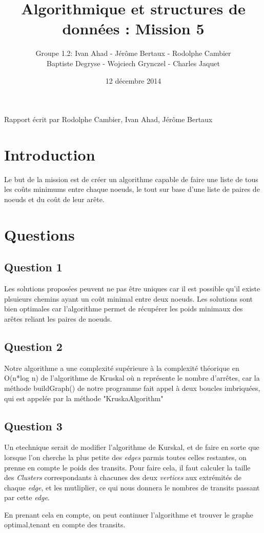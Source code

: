 \documentclass[a4paper]{article}
\title{Algorithmique et structures de données : Mission 5}
\date{12 décembre 2014}
\author{Groupe 1.2: Ivan Ahad - Jérôme Bertaux - Rodolphe Cambier \\ 
	Baptiste Degryse - Wojciech Grynczel - Charles Jaquet}
\begin{document}
\maketitle


Rapport écrit par Rodolphe Cambier, Ivan Ahad, Jérôme Bertaux
\section*{Introduction}
Le but de la mission est de créer un algorithme capable de faire une liste de tous les coûts minimums entre chaque noeuds, le tout sur base d'une liste de paires de noeuds et du coût de leur arête. 
\section*{Questions}

\subsection*{Question 1}
Les solutions proposées peuvent ne pas être uniques car il est possible qu'il existe plsuieurs chemins ayant un coût minimal entre deux noeuds. Les solutions sont bien optimales car l'algorithme permet de récupérer les poids minimaux des arêtes reliant les paires de noeuds. 
\subsection*{Question 2}
Notre algorithme a une complexité supérieure à la complexité théorique en O(n*log n) de l'algorithme de Kruskal où n représente le nombre d'arrêtes, car la méthode buildGraph() de notre programme fait appel à deux boucles imbriquées, qui est appelée par la méthode "KruskaAlgorithm" 
\subsection*{Question 3}

Un etechnique serait de modifier l'algorithme de Kurskal, et de faire en sorte que lorsque l'on cherche la plus petite des \textit{edges} parmis toutes celles restantes, on prenne en compte le poids des transits. Pour faire cela, il faut calculer la taille des \textit{Clusters} correspondants à chacunes des deux \textit{vertices} aux extrémités de chaque \textit{edge}, et les mutliplier, ce qui nous donnera le nombres de transits passant par cette \textit{edge}.

En prenant cela en compte, on peut continuer l'algorithme et trouver le graphe optimal,tenant en compte des transits.
\end{document}

